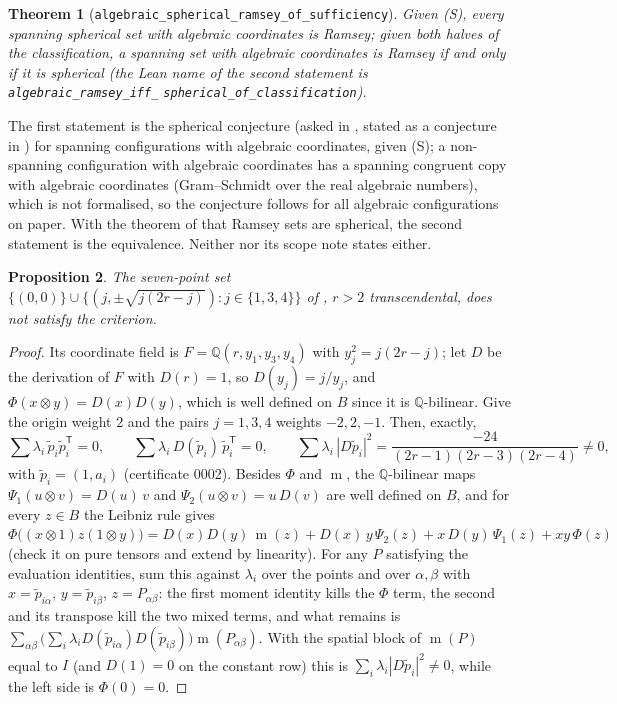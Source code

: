 \documentclass[11pt]{article}
\newtheorem{theorem}{Theorem}
\newtheorem{proposition}[theorem]{Proposition}
\theoremstyle{definition}
\theoremstyle{remark}
\newcommand{\Q}{\mathbb{Q}}
\newcommand{\B}{B}
\DeclareMathOperator{\m}{m}
\begin{document}
\begin{theorem}[\texttt{algebraic\_spherical\_ramsey\_of\_sufficiency}]
Given \emph{(S)}, every spanning spherical set with algebraic coordinates is Ramsey; given both halves of the
classification, a spanning set with algebraic coordinates is Ramsey if and only if it is spherical
(the Lean name of the second statement is \texttt{algebraic\_ramsey\_iff\_}\allowbreak
\texttt{spherical\_of\_classification}).
\end{theorem}

The first statement is the spherical conjecture (asked in \cite{egmrss}, stated as a conjecture in
\cite{graham}) for spanning configurations with algebraic coordinates, given (S); a non-spanning
configuration with algebraic coordinates has a spanning congruent copy with algebraic coordinates
(Gram--Schmidt over the real algebraic numbers), which is not formalised, so the conjecture follows for
all algebraic configurations on paper. With the theorem of \cite{egmrss} that Ramsey sets are spherical,
the second statement is the equivalence. Neither \cite{oai} nor its scope note states either.

\begin{proposition}\label{prop:hept}
The seven-point set $\{(0,0)\} \cup \{(j, \pm\sqrt{j(2r-j)}) : j \in \{1,3,4\}\}$ of \cite{palvolgyi}, $r > 2$
transcendental, does not satisfy the criterion.
\end{proposition}

\begin{proof}
Its coordinate field is $F = \Q(r, y_1, y_3, y_4)$ with $y_j^2 = j(2r-j)$; let $D$ be the derivation of
$F$ with $D(r) = 1$, so $D(y_j) = j/y_j$, and $\Phi(x \otimes y) = D(x) D(y)$, which is well defined on
$\B$ since it is $\Q$-bilinear. Give the origin weight $2$ and the pairs $j = 1, 3, 4$ weights $-2, 2, -1$.
Then, exactly,
\[
\textstyle\sum \lambda_i\, \tilde p_i \tilde p_i^{\mathsf T} = 0, \qquad
\sum \lambda_i\, D(\tilde p_i)\, \tilde p_i^{\mathsf T} = 0, \qquad
\sum \lambda_i\, |D \tilde p_i|^2 = \frac{-24}{(2r-1)(2r-3)(2r-4)} \neq 0,
\]
with $\tilde p_i = (1, a_i)$ (certificate 0002). Besides $\Phi$ and $\m$, the $\Q$-bilinear maps
$\Psi_1(u \otimes v) = D(u)\, v$ and $\Psi_2(u \otimes v) = u\, D(v)$ are well defined on $\B$, and for
every $z \in \B$ the Leibniz rule gives
$\Phi\big((x \otimes 1) z (1 \otimes y)\big) = D(x) D(y)\, \m(z) + D(x)\, y\, \Psi_2(z) + x\, D(y)\, \Psi_1(z) + xy\, \Phi(z)$
(check it on pure tensors and extend by linearity). For any $P$ satisfying the evaluation identities, sum
this against $\lambda_i$ over the points and over $\alpha, \beta$ with $x = \tilde p_{i\alpha}$,
$y = \tilde p_{i\beta}$, $z = P_{\alpha\beta}$: the first moment identity kills the $\Phi$ term, the second
and its transpose kill the two mixed terms, and what remains is $\sum_{\alpha\beta} \big(\sum_i \lambda_i D(\tilde p_{i\alpha}) D(\tilde p_{i\beta})\big) \m(P_{\alpha\beta})$.
With the spatial block of $\m(P)$ equal to $I$ (and $D(1) = 0$ on the constant row) this is
$\sum_i \lambda_i |D \tilde p_i|^2 \neq 0$, while the left side is $\Phi(0) = 0$.
\end{proof}
\end{document}
